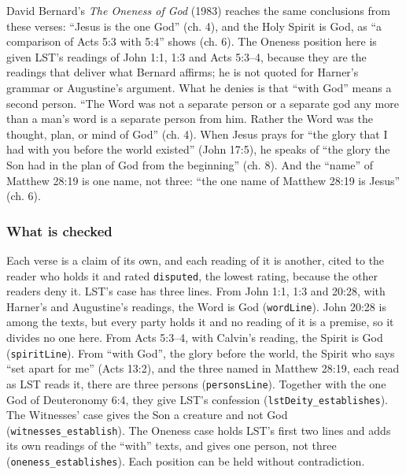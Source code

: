 \documentclass[11pt,paper=\testimonypaper,DIV=13,parskip=false]{scrartcl}
\begin{document}
David Bernard’s \emph{The Oneness of God} (1983) reaches the same conclusions from these verses: “Jesus is the one God” (ch. 4), and the Holy Spirit is God, as “a comparison of Acts 5:3 with 5:4” shows (ch. 6). The Oneness position here is given LST’s readings of John 1:1, 1:3 and Acts 5:3–4, because they are the readings that deliver what Bernard affirms; he is not quoted for Harner’s grammar or Augustine’s argument. What he denies is that “with God” means a second person. “The Word was not a separate person or a separate god any more than a man’s word is a separate person from him. Rather the Word was the thought, plan, or mind of God” (ch. 4). When Jesus prays for “the glory that I had with you before the world existed” (John 17:5), he speaks of “the glory the Son had in the plan of God from the beginning” (ch. 8). And the “name” of Matthew 28:19 is one name, not three: “the one name of Matthew 28:19 is Jesus” (ch. 6).

\subsubsection*{What is checked}
Each verse is a claim of its own, and each reading of it is another, cited to the reader who holds it and rated \texttt{disputed}, the lowest rating, because the other readers deny it. LST’s case has three lines. From John 1:1, 1:3 and 20:28, with Harner’s and Augustine’s readings, the Word is God (\texttt{word\allowbreak{}Line}). John 20:28 is among the texts, but every party holds it and no reading of it is a premise, so it divides no one here. From Acts 5:3–4, with Calvin’s reading, the Spirit is God (\texttt{spirit\allowbreak{}Line}). From “with God”, the glory before the world, the Spirit who says “set apart for me” (Acts 13:2), and the three named in Matthew 28:19, each read as LST reads it, there are three persons (\texttt{persons\allowbreak{}Line}). Together with the one God of Deuteronomy 6:4, they give LST’s confession (\texttt{lst\allowbreak{}Deity\_\allowbreak{}establishes}). The Witnesses’ case gives the Son a creature and not God (\texttt{witnesses\_\allowbreak{}establish}). The Oneness case holds LST’s first two lines and adds its own readings of the “with” texts, and gives one person, not three (\texttt{oneness\_\allowbreak{}establishes}). Each position can be held without contradiction.
\end{document}
